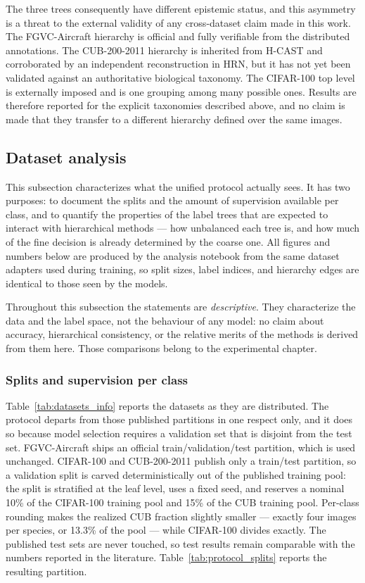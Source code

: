 The three trees consequently have different epistemic status, and this asymmetry is a threat to the external validity of any cross-dataset claim made in this work. The FGVC-Aircraft hierarchy is official and fully verifiable from the distributed annotations. The CUB-200-2011 hierarchy is inherited from H-CAST and corroborated by an independent reconstruction in HRN, but it has not yet been validated against an authoritative biological taxonomy. The CIFAR-100 top level is externally imposed and is one grouping among many possible ones. Results are therefore reported for the explicit taxonomies described above, and no claim is made that they transfer to a different hierarchy defined over the same images.


\subsection{Dataset analysis}
\label{sec:dataset_analysis}

This subsection characterizes what the unified protocol actually sees. It has two purposes: to document the splits and the amount of supervision available per class, and to quantify the properties of the label trees that are expected to interact with hierarchical methods --- how unbalanced each tree is, and how much of the fine decision is already determined by the coarse one. All figures and numbers below are produced by the analysis notebook from the same dataset adapters used during training, so split sizes, label indices, and hierarchy edges are identical to those seen by the models.

Throughout this subsection the statements are \emph{descriptive}. They characterize the data and the label space, not the behaviour of any model: no claim about accuracy, hierarchical consistency, or the relative merits of the methods is derived from them here. Those comparisons belong to the experimental chapter.

\subsubsection{Splits and supervision per class}

Table~\ref{tab:datasets_info} reports the datasets as they are distributed. The protocol departs from those published partitions in one respect only, and it does so because model selection requires a validation set that is disjoint from the test set. FGVC-Aircraft ships an official train/validation/test partition, which is used unchanged. CIFAR-100 and CUB-200-2011 publish only a train/test partition, so a validation split is carved deterministically out of the published training pool: the split is stratified at the leaf level, uses a fixed seed, and reserves a nominal 10\% of the CIFAR-100 training pool and 15\% of the CUB training pool. Per-class rounding makes the realized CUB fraction slightly smaller --- exactly four images per species, or 13.3\% of the pool --- while CIFAR-100 divides exactly. The published test sets are never touched, so test results remain comparable with the numbers reported in the literature. Table~\ref{tab:protocol_splits} reports the resulting partition.

